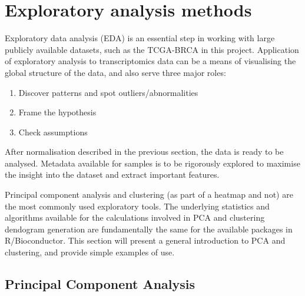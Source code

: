 


    
    
   
    
\section{Exploratory analysis methods}
    
    Exploratory data analysis (EDA) is an essential step in working with large publicly available datasets, such as the TCGA-BRCA in this project. Application of exploratory analysis to transcriptomics data can be a means of visualising the global structure of the data, and also serve three major roles: 
    
    \begin{enumerate}
      \item Discover patterns and spot outliers/abnormalities
      \item Frame the hypothesis
      \item Check assumptions 
    \end{enumerate}
    
    After normalisation described in the previous section, the data is ready to be analysed.  Metadata available for samples is to be rigorously explored to maximise the insight into the dataset and extract important features.
    
    Principal component analysis and clustering (as part of a heatmap and not) are the most commonly used exploratory tools. The underlying statistics and algorithms available for the calculations involved in PCA and clustering dendogram generation are fundamentally the same for the available packages in R/Bioconductor. 
    This section will present a general introduction to PCA and clustering, and provide simple examples of use.

    \newpage
    \subsection{Principal Component Analysis}
    
